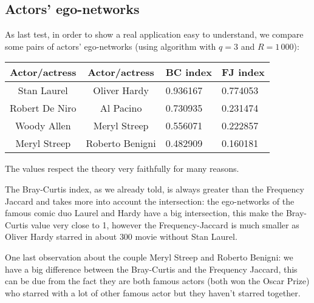 	\subsection*{Actors' ego-networks}
	
	As last test, in order to show a real application easy to understand, we compare
	some pairs of actors' ego-networks (using \fcount algorithm with $q=3$ and $R=1\,000$):
	
	\begin{table}[h]
		\centering
		\begin{tabular}{c|c|l|l}
			Actor/actress & Actor/actress & BC index & FJ index\\ 
			\hline
			Stan Laurel & Oliver Hardy & 0.936167 & 0.774053 \\
			Robert De Niro & Al Pacino & 0.730935 & 0.231474\\
			Woody Allen & Meryl Streep & 0.556071 & 0.222857\\
			Meryl Streep & Roberto Benigni & 0.482909 & 0.160181\\
		\end{tabular}
	\end{table}

	The values respect the theory very faithfully for many reasons.
	
	The Bray-Curtis index, as we already told, is always greater than the Frequency Jaccard and takes more into account the intersection:
	the ego-networks of the famous comic duo Laurel and Hardy have a big intersection, this make the Bray-Curtis value very close to 1, however the Frequency-Jaccard is much smaller as Oliver Hardy starred in about $300$ movie without Stan Laurel.
	
	One last observation about the couple Meryl Streep and Roberto Benigni: we have a big difference between the Bray-Curtis and the Frequency Jaccard, this can be due from the fact they are both famous actors (both won the Oscar Prize) who starred with a lot of other famous actor but they haven't starred together.